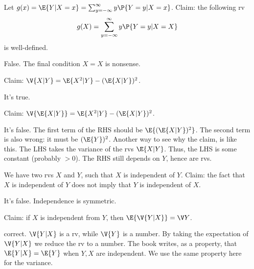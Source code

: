 \documentclass[tf-tutorial-all.tex]{subfiles}
\begin{document}
\begin{truefalse}
Let $g(x) =\E{Y|X=x} = \sum_{y=-\infty}^{\infty} y \P{Y=y|X=x}$.
Claim: the following rv
\begin{equation}
\label{eq:11}
g(X) = \sum_{y=-\infty}^{\infty} y \P{Y=y|X=X}
\end{equation}
is well-defined.

\begin{solution}
False. The final condition $X=X$ is nonsense.
\end{solution}
\end{truefalse}


\begin{truefalse}
Claim: $\V{X|Y} = \E{X^2|Y} - (\E{X|Y})^{2}$.

\begin{solution}
It's true.
\end{solution}
\end{truefalse}

\begin{truefalse}
Claim: $\V{\E{X|Y}} = \E{X^2|Y} - (\E{X|Y})^{2}$.

\begin{solution}
It's false. The first term of the RHS should be $\E{(\E{X|Y})^{2}}$. The second term is also wrong: it must be $(\E{Y})^{2}$. Another  way to see why the claim, is like this. The LHS takes the variance of the rvs $\E{X|Y}$. Thus, the LHS is some constant (probably $>0$). The RHS still depends on $Y$, hence are rvs.
\end{solution}
\end{truefalse}

\begin{truefalse}
We have two rvs $X$ and $Y$, such that $X$ is independent of $Y$. Claim:  the fact that $X$  is independent of $Y$ does not imply that $Y$  is independent of $X$.

\begin{solution}
It's false. Independence is symmetric.
\end{solution}
\end{truefalse}

\begin{truefalse}
Claim: if $X$ is independent from $Y$, then $\E{\V{Y|X}} = \V Y$.

\begin{solution}
correct. $\V{Y|X}$ is a rv, while $\V{Y}$ is a number. By taking the expectation of $\V{Y|X}$ we reduce the rv to a number.
The book writes, as a property, that $\E{Y|X} = \E{Y}$ when $Y,X$ are independent. We use the same property here for the variance.
\end{solution}
\end{truefalse}
\end{document}

